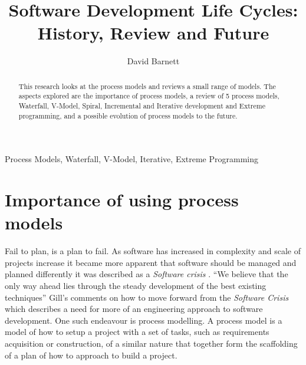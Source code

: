 \documentclass{style/CRPITStyle}
\renewcommand{\cite}{\citep}
\begin{document}
\title{Software Development Life Cycles: History, Review and Future}
\author{David Barnett}

\maketitle

\begin{abstract}
    This research looks at the process models and reviews a small range of
    models. The aspects explored are the importance of process models, a review
    of 5 process models, Waterfall, V-Model, Spiral, Incremental and Iterative
    development and Extreme programming, and a possible evolution of process
    models to the future. 
\end{abstract}

\vspace{.1in}

 Process Models, Waterfall, V-Model, Iterative, Extreme
Programming

\vspace{.1in}

\section{Importance of using process models}

Fail to plan, is a plan to fail. 
As software has increased in complexity and scale of projects increase it
became more apparent that software should be managed and planned differently it was
described as a \emph{Software crisis} \cite{nato:1969}.
``We believe that the only way ahead lies through the steady development of the best existing 
techniques'' \cite{nato:1969} Gill's comments on how to move forward from the
\emph{Software Crisis} which describes a need for more of an engineering approach to software development.
One such endeavour is process modelling.
A process model is a model of how to setup a project with a set of tasks,
such as requirements acquisition or construction, of a similar nature that together form 
the scaffolding of a plan of how to approach to build a project.
\end{document}
